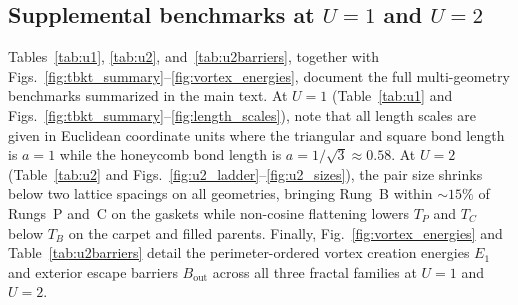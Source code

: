 \documentclass[aps,prb,twocolumn,superscriptaddress,floatfix]{revtex4-2}
\begin{document}
\subsection{Supplemental benchmarks at \texorpdfstring{$U=1$}{U=1} and \texorpdfstring{$U=2$}{U=2}}

Tables~\ref{tab:u1}, \ref{tab:u2}, and~\ref{tab:u2barriers}, together with Figs.~\ref{fig:tbkt_summary}--\ref{fig:vortex_energies}, document the full multi-geometry benchmarks summarized in the main text. At $U=1$ (Table~\ref{tab:u1} and Figs.~\ref{fig:tbkt_summary}--\ref{fig:length_scales}), note that all length scales are given in Euclidean coordinate units where the triangular and square bond length is $a = 1$ while the honeycomb bond length is $a = 1/\sqrt{3} \approx 0.58$. At $U=2$ (Table~\ref{tab:u2} and Figs.~\ref{fig:u2_ladder}--\ref{fig:u2_sizes}), the pair size shrinks below two lattice spacings on all geometries, bringing Rung~B within $\sim 15\%$ of Rungs~P and~C on the gaskets while non-cosine flattening lowers $T_P$ and $T_C$ below $T_B$ on the carpet and filled parents. Finally, Fig.~\ref{fig:vortex_energies} and Table~\ref{tab:u2barriers} detail the perimeter-ordered vortex creation energies $E_1$ and exterior escape barriers $B_{\mathrm{out}}$ across all three fractal families at $U=1$ and $U=2$.
\end{document}

